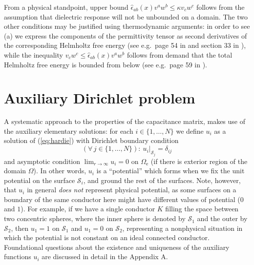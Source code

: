 \documentclass[12pt]{iopart}
\newcommand{\be}{\begin{equation}}
\newcommand{\ee}{\end{equation}}
\newcommand{\0}{\vct{0}}
\theoremstyle{plain} \newtheorem{tm}{Theorem}[section]
\theoremstyle{plain} \newtheorem{lm}[tm]{Lemma}
\theoremstyle{definition} \newtheorem{defn}[tm]{Definition}
\begin{document}
\medskip

From a physical standpoint, upper bound $\hat{\epsilon}_{ab}(x) v^a w^b \le \kappa v_c w^c$ follows from the assumption that dielectric response will not be unbounded on a domain. The two other conditions may be justified using thermodynamic arguments: in order to see (a) we express the components of the permittivity tensor as second derivatives of the corresponding Helmholtz free energy (see e.g.~page 54 in \cite{LLED} and section 33 in \cite{Kittel}), while the inequality $v_c w^c \le \hat{\epsilon}_{ab}(x) v^a w^b$ follows from demand that the total Helmholtz free energy is bounded from below (see e.g.~page 59 in \cite{LLED}).

\bigskip







\section{Auxiliary Dirichlet problem} %

A systematic approach to the properties of the capacitance matrix, makes use of the auxiliary elementary solutions: for each $i \in \{1,\dots,N\}$ we define $u_i$ as a solution of (\ref{eq:hardie}) with Dirichlet boundary condition 
\be
(\forall\,j\in\{1,\dots,N\}) : \ u_i|_{\mathcal{S}_j} = \delta_{ij}
\ee
and asymptotic condition $\lim_{r\to\infty} u_i = 0$ on $\Omega_{\mathrm{e}}$ (if there is exterior region of the domain $\Omega$). In other words, $u_i$ is a ``potential'' which forms when we fix the unit potential on the surface $\mathcal{S}_i$, and ground the rest of the surfaces. Note, however, that $u_i$ in general \emph{does not} represent physical potential, as some surfaces on a boundary of the same conductor here might have different values of potential ($0$ and $1$). For example, if we have a single conductor $K$ filling the space between two concentric spheres, where the inner sphere is denoted by $\mathcal{S}_1$ and the outer by $\mathcal{S}_2$, then $u_1 = 1$ on $\mathcal{S}_1$ and $u_1 = 0$ on $\mathcal{S}_2$, representing a nonphysical situation in which the potential is not constant on an ideal connected conductor. Foundational questions about the existence and uniqueness of the auxiliary functions $u_i$ are discussed in detail in the Appendix A.
\end{document}
